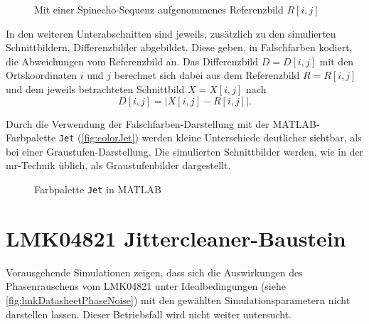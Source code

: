 \begin{figure}[H]
	\centering
	\caption[Referenzbild]{Mit einer Spinecho-Sequenz aufgenommenes Referenzbild $R[i,j]$}
	\label{fig:R}
\end{figure}

In den weiteren Unterabschnitten sind jeweils, zusätzlich zu den simulierten Schnittbildern, Differenzbilder abgebildet. Diese geben, in Falschfarben kodiert, die Abweichungen vom Referenzbild an. Das Differenzbild $D=D[i,j]$ mit den Ortskoordinaten $i$ und $j$ berechnet sich dabei aus dem Referenzbild $R=R[i,j]$ und dem jeweils betrachteten Schnittbild $X=X[i,j]$ nach
\begin{equation}
	D[i,j]=\left| X[i,j]-R[i,j]\right|.
\end{equation}

Durch die Verwendung der Falschfarben-Darstellung mit der MATLAB-Farbpalette \texttt{Jet} (\autoref{fig:colorJet}) werden kleine Unterschiede deutlicher sichtbar, als bei einer Graustufen-Darstellung. Die simulierten Schnittbilder werden, wie in der \gls{mr}-Technik üblich, als Graustufenbilder dargestellt.

\begin{figure}[H]
	\centering
	\caption[]{Farbpalette \texttt{Jet} in MATLAB}
	\label{fig:colorJet}
\end{figure}




\clearpage
\section{LMK04821 Jittercleaner-Baustein}
Vorausgehende Simulationen zeigen, dass sich die Auswirkungen des Phasenrauschens vom LMK04821 unter Idealbedingungen (siehe \autoref{fig:lmkDatasheetPhaseNoise}) mit den gewählten Simulationsparametern nicht darstellen lassen. Dieser Betriebsfall wird nicht weiter untersucht.

